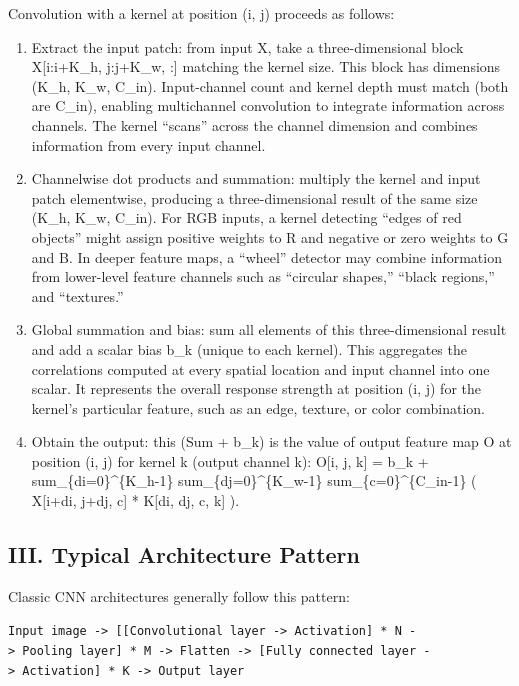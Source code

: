 Convolution with a kernel at position (i, j) proceeds as follows:

\begin{enumerate}
\def\labelenumi{(\arabic{enumi})}
\item
  Extract the input patch: from input X, take a three-dimensional block X{[}i:i+K\_h, j:j+K\_w, :{]} matching the kernel size. This block has dimensions (K\_h, K\_w, C\_in). Input-channel count and kernel depth must match (both are C\_in), enabling multichannel convolution to integrate information across channels. The kernel ``scans'' across the channel dimension and combines information from every input channel.
\item
  Channelwise dot products and summation: multiply the kernel and input patch elementwise, producing a three-dimensional result of the same size (K\_h, K\_w, C\_in). For RGB inputs, a kernel detecting ``edges of red objects'' might assign positive weights to R and negative or zero weights to G and B. In deeper feature maps, a ``wheel'' detector may combine information from lower-level feature channels such as ``circular shapes,'' ``black regions,'' and ``textures.''
\item
  Global summation and bias: sum all elements of this three-dimensional result and add a scalar bias b\_k (unique to each kernel). This aggregates the correlations computed at every spatial location and input channel into one scalar. It represents the overall response strength at position (i, j) for the kernel's particular feature, such as an edge, texture, or color combination.
\item
  Obtain the output: this (Sum + b\_k) is the value of output feature map O at position (i, j) for kernel k (output channel k): O{[}i, j, k{]} = b\_k + sum\_\{di=0\}\^{}\{K\_h-1\} sum\_\{dj=0\}\^{}\{K\_w-1\} sum\_\{c=0\}\^{}\{C\_in-1\} ( X{[}i+di, j+dj, c{]} * K{[}di, dj, c, k{]} ).
\end{enumerate}

\hypertarget{iii.-typical-architecture-pattern}{%
\subsection{III. Typical Architecture Pattern}\label{iii.-typical-architecture-pattern}}

Classic CNN architectures generally follow this pattern:

\texttt{Input\ image\ -\textgreater{}\ {[}{[}Convolutional\ layer\ -\textgreater{}\ Activation{]}\ *\ N\ -\textgreater{}\ Pooling\ layer{]}\ *\ M\ -\textgreater{}\ Flatten\ -\textgreater{}\ {[}Fully\ connected\ layer\ -\textgreater{}\ Activation{]}\ *\ K\ -\textgreater{}\ Output\ layer}

